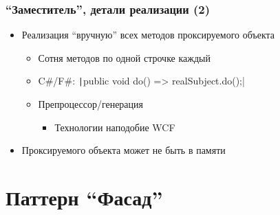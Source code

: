 \documentclass{../cscslides}
\begin{document}
    \begin{frame}
        \frametitle{``Заместитель'', детали реализации (2)}
        \begin{itemize}
            \item Реализация ``вручную'' всех методов проксируемого объекта
            \begin{itemize}
                \item Сотня методов по одной строчке каждый
                \item C\#/F\#: \texttt|public void do() => realSubject.do();|
                \item Препроцессор/генерация
                \begin{itemize}
                    \item Технологии наподобие WCF
                \end{itemize}
            \end{itemize}
            \item Проксируемого объекта может не быть в памяти
        \end{itemize}
    \end{frame}

    \section{Паттерн ``Фасад''}
\end{document}
